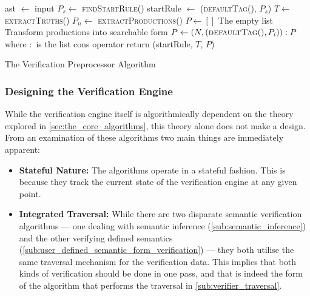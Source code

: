 \begin{algorithm}[!htb]
\begin{algorithmic}
\State
\State ast $\gets$ input
\State
\State $P_s \gets$ \textsc{findStartRule}() 
\State startRule $\gets$ (\textsc{defaultTag}(), $P_s$)
\State $T \gets$ \textsc{extractTruths}()
\State $P_n \gets$ \textsc{extractProductions}()
\State $P \gets []$
\Comment The empty list
\Comment Transform productions into searchable form
    \State $P \gets (N, (\textsc{defaultTag}(), P_i)) : P$
    \Comment where $:$ is the list cons operator
\EndFor
\State
\State return (startRule, $T$, $P$)
\end{algorithmic}
\caption{The Verification Preprocessor Algorithm}
\label{alg:the_verification_preprocessor_algorithm}
\end{algorithm}


\subsubsection{Designing the Verification Engine} %
\label{ssub:designing_the_verification_engine}
While the verification engine itself is algorithmically dependent on the theory explored in \autoref{sec:the_core_algorithms}, this theory alone does not make a design. 
From an examination of these algorithms two main things are immediately apparent:
\begin{itemize}
    \item \textbf{Stateful Nature:} The algorithms operate in a stateful fashion.
    This is because they track the current state of the verification engine at any given point.
    \item \textbf{Integrated Traversal:} While there are two disparate semantic verification algorithms --- one dealing with semantic inference (\autoref{sub:semantic_inference}) and the other verifying defined semantics (\autoref{sub:user_defined_semantic_form_verification}) --- they both utilise the same traversal mechanism for the verification data. 
    This implies that both kinds of verification should be done in one pass, and that is indeed the form of the algorithm that performs the traversal in \autoref{sub:verifier_traversal}. 
\end{itemize}

